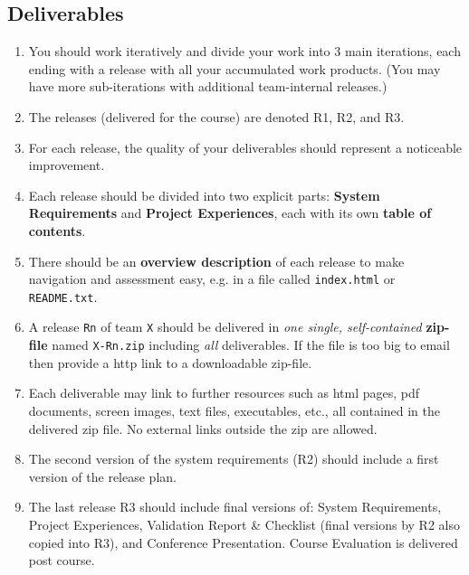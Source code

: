 \subsection{Deliverables}
  \begin{enumerate}[nolistsep]
    \item You should work iteratively and divide your work into 3 main iterations, each ending with a release with all your accumulated work products. (You may have more sub-iterations with additional team-internal releases.)
    \item The releases (delivered for the course) are denoted R1, R2, and R3.
    \item For each release, the quality of your deliverables should represent a noticeable improvement.
    \item Each release should be divided into two explicit parts: {\bf System Requirements} and {\bf Project Experiences}, each with its own {\bf table of contents}.
    \item There should be an {\bf overview description} of each release to make navigation and assessment easy, e.g. in a file called \verb+index.html+ or \verb+README.txt+.
    \item A release \verb+Rn+ of team \verb+X+ should be delivered in {\it one single, self-contained} {\bf zip-file} named \verb+X-Rn.zip+ including {\it all} deliverables. If the file is too big to email then provide a http link to a downloadable zip-file.
    \item Each deliverable may link to further resources such as html pages, pdf documents, screen images, text files, executables, etc., all contained in the delivered zip file. No external links outside the zip are allowed.
    \item The second version of the system requirements (R2) should include a first version of the release plan.
    \item The last release R3 should include final versions of: System Requirements, Project Experiences, Validation Report \& Checklist (final versions by R2 also copied into R3), and Conference Presentation. Course Evaluation is delivered post course.


\end{enumerate}
